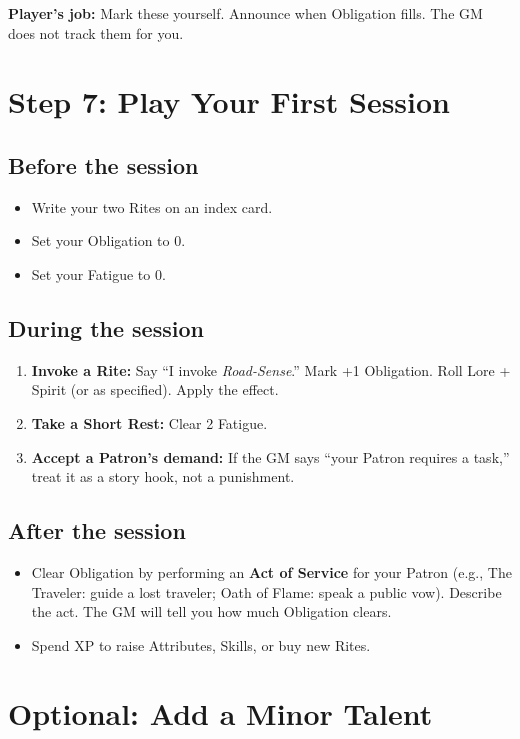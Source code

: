 \textbf{Player's job:} Mark these yourself. Announce when Obligation fills. The GM does not track them for you.

\section{Step 7: Play Your First Session}
\label{sec:first-session-magic}

\subsection*{Before the session}
\begin{itemize}
  \item Write your two Rites on an index card.
  \item Set your Obligation to 0.
  \item Set your Fatigue to 0.
\end{itemize}

\subsection*{During the session}
\begin{enumerate}
  \item \textbf{Invoke a Rite:} Say ``I invoke \emph{Road-Sense}.'' Mark +1 Obligation. Roll Lore + Spirit (or as specified). Apply the effect.
  \item \textbf{Take a Short Rest:} Clear 2 Fatigue.
  \item \textbf{Accept a Patron's demand:} If the GM says ``your Patron requires a task,'' treat it as a story hook, not a punishment.
\end{enumerate}

\subsection*{After the session}
\begin{itemize}
  \item Clear Obligation by performing an \textbf{Act of Service} for your Patron (e.g., The Traveler: guide a lost traveler; Oath of Flame: speak a public vow). Describe the act. The GM will tell you how much Obligation clears.
  \item Spend XP to raise Attributes, Skills, or buy new Rites.
\end{itemize}

\section{Optional: Add a Minor Talent}

